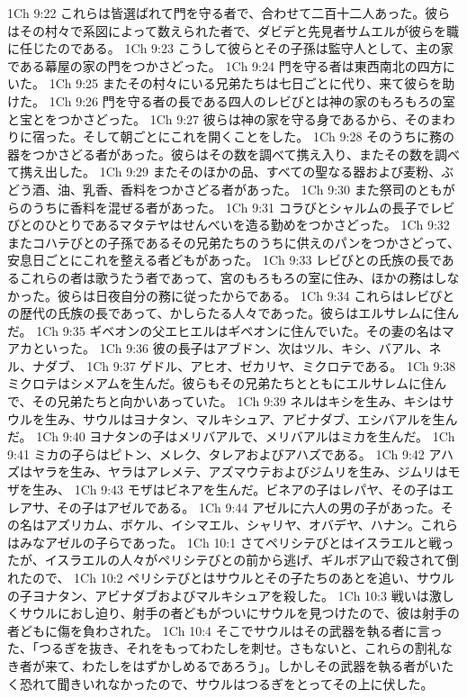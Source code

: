 1Ch 9:22  これらは皆選ばれて門を守る者で、合わせて二百十二人あった。彼らはその村々で系図によって数えられた者で、ダビデと先見者サムエルが彼らを職に任じたのである。
1Ch 9:23  こうして彼らとその子孫は監守人として、主の家である幕屋の家の門をつかさどった。
1Ch 9:24  門を守る者は東西南北の四方にいた。
1Ch 9:25  またその村々にいる兄弟たちは七日ごとに代り、来て彼らを助けた。
1Ch 9:26  門を守る者の長である四人のレビびとは神の家のもろもろの室と宝とをつかさどった。
1Ch 9:27  彼らは神の家を守る身であるから、そのまわりに宿った。そして朝ごとにこれを開くことをした。
1Ch 9:28  そのうちに務の器をつかさどる者があった。彼らはその数を調べて携え入り、またその数を調べて携え出した。
1Ch 9:29  またそのほかの品、すべての聖なる器および麦粉、ぶどう酒、油、乳香、香料をつかさどる者があった。
1Ch 9:30  また祭司のともがらのうちに香料を混ぜる者があった。
1Ch 9:31  コラびとシャルムの長子でレビびとのひとりであるマタテヤはせんべいを造る勤めをつかさどった。
1Ch 9:32  またコハテびとの子孫であるその兄弟たちのうちに供えのパンをつかさどって、安息日ごとにこれを整える者どもがあった。
1Ch 9:33  レビびとの氏族の長であるこれらの者は歌うたう者であって、宮のもろもろの室に住み、ほかの務はしなかった。彼らは日夜自分の務に従ったからである。
1Ch 9:34  これらはレビびとの歴代の氏族の長であって、かしらたる人々であった。彼らはエルサレムに住んだ。
1Ch 9:35  ギベオンの父エヒエルはギベオンに住んでいた。その妻の名はマアカといった。
1Ch 9:36  彼の長子はアブドン、次はツル、キシ、バアル、ネル、ナダブ、
1Ch 9:37  ゲドル、アヒオ、ゼカリヤ、ミクロテである。
1Ch 9:38  ミクロテはシメアムを生んだ。彼らもその兄弟たちとともにエルサレムに住んで、その兄弟たちと向かいあっていた。
1Ch 9:39  ネルはキシを生み、キシはサウルを生み、サウルはヨナタン、マルキシュア、アビナダブ、エシバアルを生んだ。
1Ch 9:40  ヨナタンの子はメリバアルで、メリバアルはミカを生んだ。
1Ch 9:41  ミカの子らはピトン、メレク、タレアおよびアハズである。
1Ch 9:42  アハズはヤラを生み、ヤラはアレメテ、アズマウテおよびジムリを生み、ジムリはモザを生み、
1Ch 9:43  モザはビネアを生んだ。ビネアの子はレパヤ、その子はエレアサ、その子はアゼルである。
1Ch 9:44  アゼルに六人の男の子があった。その名はアズリカム、ボケル、イシマエル、シャリヤ、オバデヤ、ハナン。これらはみなアゼルの子らであった。
1Ch 10:1  さてペリシテびとはイスラエルと戦ったが、イスラエルの人々がペリシテびとの前から逃げ、ギルボア山で殺されて倒れたので、
1Ch 10:2  ペリシテびとはサウルとその子たちのあとを追い、サウルの子ヨナタン、アビナダブおよびマルキシュアを殺した。
1Ch 10:3  戦いは激しくサウルにおし迫り、射手の者どもがついにサウルを見つけたので、彼は射手の者どもに傷を負わされた。
1Ch 10:4  そこでサウルはその武器を執る者に言った、「つるぎを抜き、それをもってわたしを刺せ。さもないと、これらの割礼なき者が来て、わたしをはずかしめるであろう」。しかしその武器を執る者がいたく恐れて聞きいれなかったので、サウルはつるぎをとってその上に伏した。
